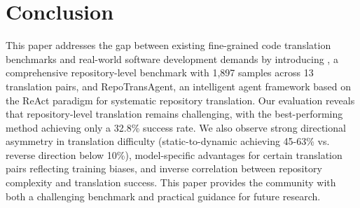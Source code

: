 \section{Conclusion}
This paper addresses the gap between existing fine-grained code translation benchmarks and real-world software development demands by introducing \toolname, a comprehensive repository-level benchmark with 1,897 samples across 13 translation pairs, and RepoTransAgent, an intelligent agent framework based on the ReAct paradigm for systematic repository translation. Our evaluation reveals that repository-level translation remains challenging, with the best-performing method achieving only a 32.8\% success rate. We also observe strong directional asymmetry in translation difficulty (static-to-dynamic achieving 45-63\% vs. reverse direction below 10\%), model-specific advantages for certain translation pairs reflecting training biases, and inverse correlation between repository complexity and translation success. This paper provides the community with both a challenging benchmark and practical guidance for future research.
